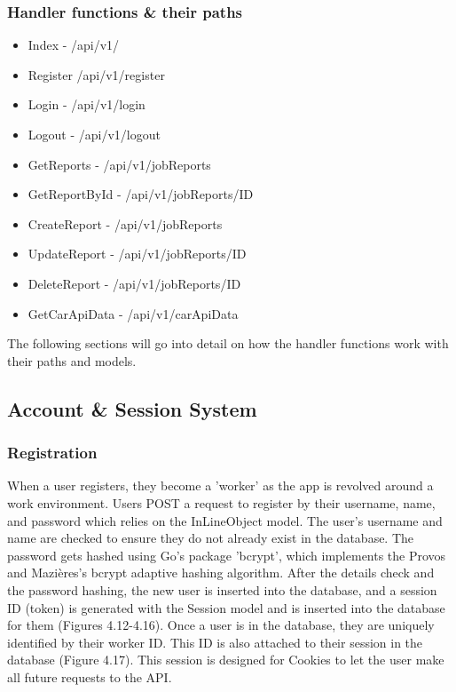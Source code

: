 \subsubsection{Handler functions \& their paths}
\begin{itemize}
    \item Index - /api/v1/
    \item Register /api/v1/register
    \item Login - /api/v1/login
     \item Logout - /api/v1/logout
    \item GetReports - /api/v1/jobReports
    \item GetReportById - /api/v1/jobReports/ID
    \item CreateReport - /api/v1/jobReports
    \item UpdateReport - /api/v1/jobReports/ID
    \item DeleteReport - /api/v1/jobReports/ID
    \item GetCarApiData - /api/v1/carApiData
\end{itemize}

The following sections will go into detail on how the handler functions work with their paths and models.

\subsection{Account \& Session System}
\subsubsection{Registration}
When a user registers, they become a 'worker' as the app is revolved around a work environment. Users POST a request to register by their username, name, and password which relies on the InLineObject model. The user's username and name are checked to ensure they do not already exist in the database. The password gets hashed using Go's package 'bcrypt', which implements the Provos and Mazières's bcrypt adaptive hashing algorithm. \cite{ref14} After the details check and the password hashing, the new user is inserted into the database, and a session ID (token) is generated with the Session model and is inserted into the database for them (Figures 4.12-4.16). Once a user is in the database, they are uniquely identified by their worker ID. This ID is also attached to their session in the database (Figure 4.17). This session is designed for Cookies to let the user make all future requests to the API.

